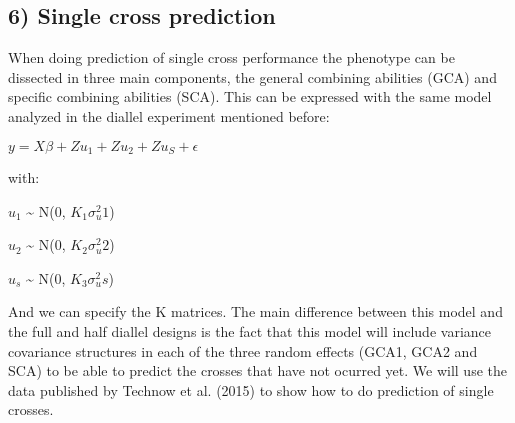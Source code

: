 \documentclass[]{article}
\newenvironment{Shaded}{\begin{snugshade}}{\end{snugshade}}
\newcommand{\KeywordTok}[1]{\textcolor[rgb]{0.13,0.29,0.53}{\textbf{#1}}}
\newcommand{\DataTypeTok}[1]{\textcolor[rgb]{0.13,0.29,0.53}{#1}}
\newcommand{\DecValTok}[1]{\textcolor[rgb]{0.00,0.00,0.81}{#1}}
\newcommand{\StringTok}[1]{\textcolor[rgb]{0.31,0.60,0.02}{#1}}
\newcommand{\CommentTok}[1]{\textcolor[rgb]{0.56,0.35,0.01}{\textit{#1}}}
\newcommand{\OtherTok}[1]{\textcolor[rgb]{0.56,0.35,0.01}{#1}}
\newcommand{\OperatorTok}[1]{\textcolor[rgb]{0.81,0.36,0.00}{\textbf{#1}}}
\newcommand{\NormalTok}[1]{#1}
\begin{document}
\subsection{6) Single cross prediction}\label{single-cross-prediction}

When doing prediction of single cross performance the phenotype can be
dissected in three main components, the general combining abilities
(GCA) and specific combining abilities (SCA). This can be expressed with
the same model analyzed in the diallel experiment mentioned before:

\(y = X\beta + Zu_1 + Zu_2 + Zu_S + \epsilon\)

with:

\(u_1\) \textasciitilde{} N(0, \(K_1\)\(\sigma^2_u1\))

\(u_2\) \textasciitilde{} N(0, \(K_2\)\(\sigma^2_u2\))

\(u_s\) \textasciitilde{} N(0, \(K_3\)\(\sigma^2_us\))

And we can specify the K matrices. The main difference between this
model and the full and half diallel designs is the fact that this model
will include variance covariance structures in each of the three random
effects (GCA1, GCA2 and SCA) to be able to predict the crosses that have
not ocurred yet. We will use the data published by Technow et al. (2015)
to show how to do prediction of single crosses.

\begin{Shaded}
\end{Shaded}
\end{document}
